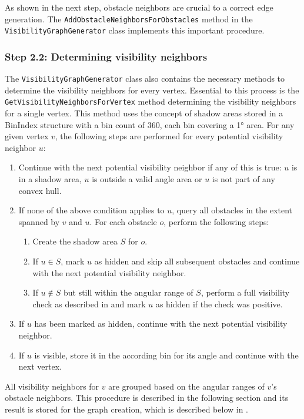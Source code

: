			As shown in the next step, obstacle neighbors are crucial to a correct edge generation.
			The \texttt{AddObstacleNeighborsForObstacles} method in the \texttt{VisibilityGraphGenerator} class implements this important procedure.
			
		\subsubsection{Step 2.2: Determining visibility neighbors}
		
			The \texttt{VisibilityGraphGenerator} class also contains the necessary methods to determine the visibility neighbors for every vertex.
			Essential to this process is the \texttt{GetVisibilityNeighborsForVertex} method determining the visibility neighbors for a single vertex.
			This method uses the concept of shadow areas stored in a BinIndex structure with a bin count of 360, each bin covering a 1° area.
			For any given vertex $v$, the following steps are performed for every potential visibility neighbor $u$:
			\begin{enumerate}[leftmargin=2.25em+\widthof{2.2.},label={2.2.\arabic*.}]
				\item Continue with the next potential visibility neighbor if any of this is true: $u$ is in a shadow area, $u$ is outside a valid angle area or $u$ is not part of any convex hull.
				\item If none of the above condition applies to $u$, query all obstacles in the extent spanned by $v$ and $u$. For each obstacle $o$, perform the following steps:
				\begin{enumerate}[leftmargin=2.25em+\widthof{2.2.}-1em]
					\item Create the shadow area $S$ for $o$.
					\item If $u \in S$, mark $u$ as hidden and skip all subsequent obstacles and continue with the next potential visibility neighbor.
					\item If $u \not\in S$ but still within the angular range of $S$, perform a full visibility check as described in  and mark $u$ as hidden if the check was positive.
				\end{enumerate}
				\item If $u$ has been marked as hidden, continue with the next potential visibility neighbor.
				\item If $u$ is visible, store it in the according bin for its angle and continue with the next vertex.
			\end{enumerate}
			All visibility neighbors for $v$ are grouped based on the angular ranges of $v$'s obstacle neighbors.
			This procedure is described in the following section and its result is stored for the graph creation, which is described below in .
		
